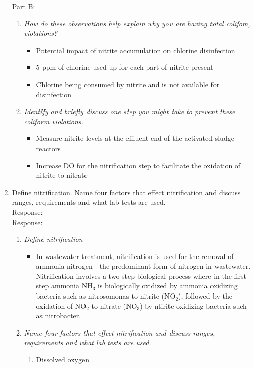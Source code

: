 \begin{enumerate}
\begin{enumerate}[label=\alph*]
\end{enumerate}
Part B:\\
\begin{enumerate}[label=\alph*]
\item \textit{How do these observations help explain why you are having total colifom, violations?}
\begin{itemize}
\item Potential impact of nitrite accumulation on chlorine disinfection
\item 5 ppm of chlorine used up for each part of nitrite present
\item Chlorine being consumed by nitrite and is not available for disinfection
\end{itemize}
\item \textit{Identify and briefly discuss one step you might take to prevent these coliform violations.}
\begin{itemize}
\item Measure nitrite levels at the effluent end of the activated sludge reactors
\item Increase DO for the nitrification step to facilitate the oxidation of nitrite to nitrate 
\end{itemize}
\end{enumerate}

\newpage
\item 
Define nitrification.  Name four factors that effect nitrification and discuss ranges, requirements and what lab tests are used.\\
Response:\\

Response:\\
\begin{enumerate}[label=\alph*]
\item \textit{Define nitrification}
\begin{itemize}
\item In wastewater treatment, nitrification is used for the removal of ammonia nitrogen - the predominant form of nitrogen in wastewater.  Nitrification involves a two step biological process where in the first step ammonia NH$_3$ is biologically oxidized by ammonia oxidizing bacteria such as nitrosomonas to nitrite (NO$_2$), followed by the oxidation of NO$_2$ to nitrate (NO$_3$) by ntirite oxidizing bacteria such as nitrobacter.
\end{itemize}
\item \textit{Name four factors that effect nitrification and discuss ranges, requirements and what lab tests are used.}
\begin{enumerate}
\item Dissolved oxygen


\end{enumerate}
\end{enumerate}
\end{enumerate}
